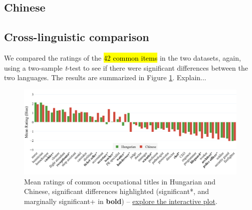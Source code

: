 \documentclass[11pt]{article}
\begin{document}
\subsection{Chinese}



\subsection{Cross-linguistic comparison}

We compared the ratings of the \hl{42 common items} in the two datasets, again, using a two-sample \textit{t}-test to see if there were significant differences between the two languages. The results are summarized in Figure \ref{fig:occupations_comparison}. Explain...

\begin{figure}[ht]
  \centering
  \includegraphics[width=\linewidth]{../occupations_comparison}
  \caption{Mean ratings of common occupational titles in Hungarian and Chinese, significant differences highlighted (significant*, and marginally significant+ in \textbf{bold}) -- \href{https://htmlpreview.github.io/?https://github.com/partigabor/occupational-bias/blob/main/occupations_comparison.html}{explore the interactive plot}.}
  \label{fig:occupations_comparison}
\end{figure}




\end{document}
